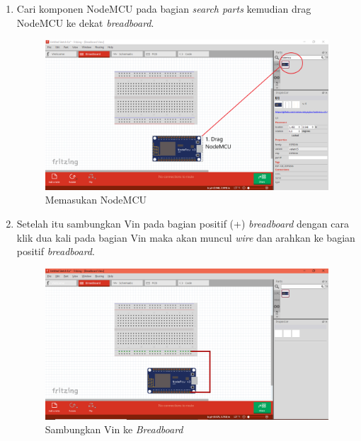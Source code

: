 \begin{enumerate}
    \item Cari komponen NodeMCU pada bagian \textit{search parts} kemudian drag NodeMCU ke dekat \textit{breadboard}.
    \begin{figure}[H]
    \centering
    \includegraphics[width=1.1\textwidth]{figures/tutor3.png}
    \caption{Memasukan NodeMCU}
    \label{print}
    \end{figure}
    
    \item Setelah itu sambungkan Vin pada bagian positif (+) \textit{breadboard} dengan cara klik dua kali pada bagian Vin maka akan muncul \textit{wire} dan arahkan ke bagian positif \textit{breadboard}.
    \begin{figure}[H]
    \centering
    \includegraphics[width=1.1\textwidth]{figures/tutor4.png}
    \caption{Sambungkan Vin ke \textit{Breadboard} }
    \label{print}
    \end{figure}
    

\end{enumerate}

